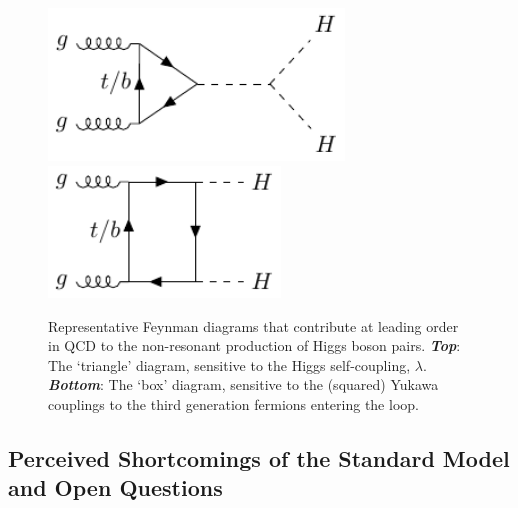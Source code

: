 \begin{figure}[!htb]
    \begin{center}
        \includegraphics[width=0.7\textwidth]{figures/search_hh/feynman_diagrams/fdiagram_triangle}
        \includegraphics[width=0.55\textwidth]{figures/search_hh/feynman_diagrams/fdiagram_box}
        \caption{
            Representative Feynman diagrams that contribute at leading order in QCD to the non-resonant
            production of Higgs boson pairs.
            {\textbf{\textit{Top}}}: The `triangle' diagram, sensitive to the Higgs self-coupling, $\lambda$.
            {\textbf{\textit{Bottom}}}: The `box' diagram, sensitive to the (squared) Yukawa couplings to the third generation
            fermions entering the loop.
        }
        \label{fig:hh_feynman}
    \end{center}
\end{figure}

%
%
\FloatBarrier
\subsection{Perceived Shortcomings of the Standard Model and Open Questions}
\label{sec:sm_shortcomings}

